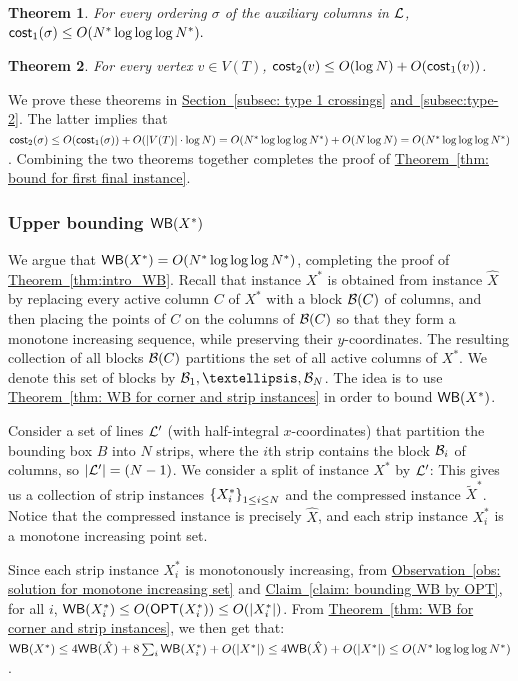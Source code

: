 \documentclass[11pt]{article}
\numberwithin{equation}{section}
\newtheorem{theorem}{Theorem}[section]
\theoremstyle{definition}
\theoremstyle{plain}
\newcommand{\expref}[2]{\hyperref[#2]{#1~\ref{#2}}}
\begin{document}
\begin{theorem}\label{thm: crossings inside instances}
	For every ordering $\sigma$ of the auxiliary columns in ${\mathcal L}$, $\mathsf{cost}_1(\sigma)\leq O(N^*\log\log\log N^*).$
	\end{theorem}


\begin{theorem}\label{thm: bound cost 2}
	For every vertex $v\in V(T)$, $\mathsf{cost}_2(v)\leq O(\log N)+O(\mathsf{cost}_1(v))$.
\end{theorem}


We prove these theorems in  \expref{Section}{subsec: type 1 crossings} \expref{and}{subsec:type-2}. 
The latter implies that $\mathsf{cost}_2(\sigma)\leq O(\mathsf{cost}_1(\sigma))+O(|V(T)|\cdot \log N)=O(N^*\log\log\log N^*)+O(N\log N)=O(N^*\log\log\log N^*)$. Combining the two theorems together completes the proof of \expref{Theorem}{thm: bound for first final instance}.



%
%
%
%
%
%
%
\subsubsection{Upper bounding $\mathsf{WB}(X^*)$}

We argue that $\mathsf{WB}(X^*)=O(N^*\log\log\log N^*)$, completing the proof of \expref{Theorem}{thm:intro_WB}. 
Recall that instance $X^*$ is obtained from instance $\hat X$ by replacing every active column $C$ of $X^*$ with a block ${\mathcal{B}}(C)$ of columns, and then placing the points of $C$ on the columns of ${\mathcal{B}}(C)$ so that they form a monotone increasing sequence, while preserving their $y$-coordinates. 
The resulting collection of all blocks ${\mathcal{B}}(C)$ partitions the set of all active columns of $X^*$. We denote this set of blocks by $\bset_1,\ldots,\bset_N$. 
The idea is to use \expref{Theorem}{thm: WB for corner and strip instances} in order to bound $\mathsf{WB}(X^*)$. 


Consider a set of lines ${\mathcal L}'$ (with half-integral $x$-coordinates) that partition the bounding box $B$ into $N$ strips, where the $i$th strip contains the block ${\mathcal{B}}_i$ of columns, so $|{\mathcal L}'| = (N-1)$. 
We consider a split of instance $X^*$ by ${\mathcal L}'$: This gives us  a collection of strip instances $\left\{ X^*_i \right\}_{1\leq i\leq N}$ and the compressed instance $\widetilde{X}^*$. 
Notice that the compressed instance is precisely $\hat{X}$, and each strip instance $X^*_i$ is a monotone increasing point set.   


%
Since each strip instance $X^*_i$ is monotonously increasing, from \expref{Observation}{obs: solution for monotone increasing set} and \expref{Claim}{claim: bounding WB by OPT}, for all $i$, $\mathsf{WB}(X^*_i)\leq O(\mbox{\sf OPT}(X^*_i))\leq O(|X^*_i|)$. From \expref{Theorem}{thm: WB for corner and strip instances}, we then get that:
$\mathsf{WB}(X^*)\leq 4\mathsf{WB}(\hat X)+8\sum_i\mathsf{WB}(X^*_i)+O(|X^*|)\leq 4\mathsf{WB}(\hat X)+O(|X^*|)\leq O(N^*\log\log\log N^*)$.
\end{document}
